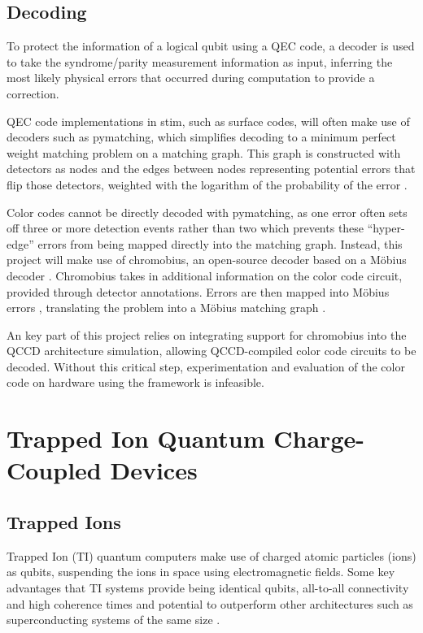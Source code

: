 \subsection{Decoding}

To protect the information of a logical qubit using a QEC code, a decoder is used to take the syndrome/parity measurement information as input, inferring the most likely physical errors that occurred during computation to provide a correction.

QEC code implementations in stim, such as surface codes, will often make use of decoders such as pymatching, which simplifies decoding to a minimum perfect weight matching problem on a matching graph. This graph is constructed with detectors as nodes and the edges between nodes representing potential errors that flip those detectors, weighted with the logarithm of the probability of the error \cite{pymatching}.

Color codes cannot be directly decoded with pymatching, as one error often sets off three or more detection events rather than two which prevents these ``hyper-edge'' errors from being mapped directly into the matching graph. Instead, this project will make use of chromobius, an open-source decoder based on a Möbius decoder \cite{mobiusdecoder}. Chromobius takes in additional information on the color code circuit, provided through detector annotations. Errors are then mapped into Möbius errors , translating the problem into a Möbius matching graph \cite{chromobius}.

An key part of this project relies on integrating support for chromobius into the QCCD architecture simulation, allowing QCCD-compiled color code circuits to be decoded.  Without this critical step, experimentation and evaluation of the color code on hardware using the framework is infeasible.


\section{Trapped Ion Quantum Charge-Coupled Devices}

\subsection{Trapped Ions}

Trapped Ion (TI) quantum computers make use of charged atomic particles (ions) as qubits, suspending the ions in space using electromagnetic fields. Some key advantages that TI systems provide being identical qubits, all-to-all connectivity and high coherence times \cite{ticoherence} and potential to outperform other architectures such as superconducting systems of the same size \cite{tivssuperconducting}.



